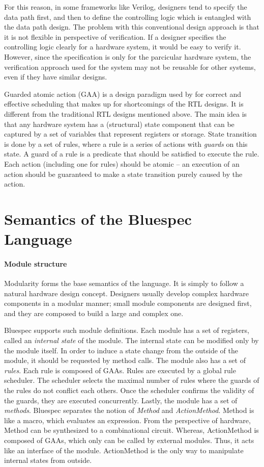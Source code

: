 For this reason, in some frameworks like Verilog, designers tend to
specify the data path first, and then to define the controlling logic
which is entangled with the data path design. The problem with this
conventional design approach is that it is not flexible in perspective
of verification. If a designer specifies the controlling logic clearly
for a hardware system, it would be easy to verify it. However, since
the specification is only for the parcicular hardware system, the
verification approach used for the system may not be reusable for
other systems, even if they have similar designs.

Guarded atomic action (GAA) is a design paradigm used by \Bluespec{}
for correct and effective scheduling that makes up for shortcomings of
the RTL designs. It is different from the traditional RTL designs
mentioned above. The main idea is that any hardware system has a
(structural) state component that can be captured by a set of
variables that represent registers or storage. State transition is
done by a set of rules, where a rule is a series of actions with
\emph{guards} on this state. A guard of a rule is a predicate that
should be satisfied to execute the rule. Each action (including one
for rules) should be atomic -- an execution of an action should be
guaranteed to make a state transition purely caused by the action.

\section{Semantics of the Bluespec Language}
\label{sec:bluespec-semantics}

\paragraph{Module structure}

Modularity forms the base semantics of the \Bluespec{} language. It is
simply to follow a natural hardware design concept. Designers usually
develop complex hardware components in a modular manner; small module
components are designed first, and they are composed to build a large
and complex one.

Bluespec supports such module definitions. Each module has a set of
registers, called an \emph{internal state} of the module. The internal
state can be modified only by the module itself. In order to induce a
state change from the outside of the module, it should be requested by
method calls. The module also has a set of \emph{rules}. Each rule is
composed of GAAs. Rules are executed by a global rule scheduler. The
scheduler selects the maximal number of rules where the guards of the
rules do not conflict each others. Once the scheduler confirms the
validity of the guards, they are executed concurrently. Lastly, the
module has a set of \emph{methods}. Bluespec separates the notion of
\emph{Method} and \emph{ActionMethod}. Method is like a macro, which
evaluates an expression. From the perspective of hardware, Method can
be synthesized to a combinational circuit.  Whereas, ActionMethod is
composed of GAAs, which only can be called by external modules. Thus,
it acts like an interface of the module. ActionMethod is the only way
to manipulate internal states from outside.


